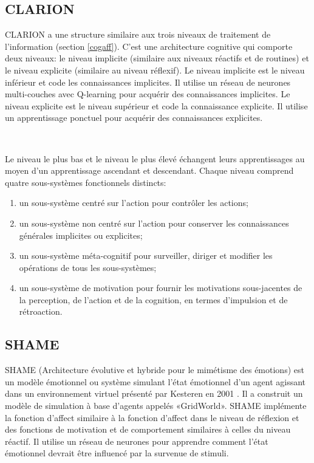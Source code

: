 \subsection{CLARION}

CLARION a une structure similaire aux trois niveaux de traitement de l’information (section \ref{cogaff}). C'est une architecture cognitive qui comporte deux niveaux: le niveau implicite (similaire aux niveaux réactifs et de routines) et le niveau explicite (similaire au niveau réflexif). Le niveau implicite est le niveau inférieur et code les connaissances implicites. Il utilise un réseau de neurones multi-couches avec Q-learning \parencite{watkins1992q} pour acquérir des connaissances implicites. Le niveau explicite est le niveau supérieur et code la connaissance explicite. Il utilise un apprentissage ponctuel pour acquérir des connaissances explicites.

~\par
Le niveau le plus bas et le niveau le plus élevé échangent leurs apprentissages au moyen d'un apprentissage ascendant et descendant. Chaque niveau comprend quatre sous-systèmes fonctionnels distincts:

\begin{enumerate}
\item un sous-système centré sur l'action pour contrôler les actions;
\item un sous-système non centré sur l'action pour conserver les connaissances générales implicites ou explicites;
\item un sous-système méta-cognitif pour surveiller, diriger et modifier les opérations de tous les sous-systèmes;
\item un sous-système de motivation pour fournir les motivations sous-jacentes de la perception, de l'action et de la cognition, en termes d'impulsion et de rétroaction.
\end{enumerate}

\subsection{SHAME}

SHAME (Architecture évolutive et hybride pour le mimétisme des émotions) est un modèle émotionnel ou système simulant l'état émotionnel d'un agent agissant dans un environnement virtuel présenté par Kesteren en 2001 \parencite{kesteren2001supervised}. Il a construit un modèle de simulation à base d'agents appelés «GridWorld». SHAME implémente la fonction d’affect similaire à la fonction d’affect dans le niveau de réflexion et des fonctions de motivation et de comportement similaires à celles du niveau réactif. Il utilise un réseau de neurones pour apprendre comment l'état émotionnel devrait être influencé par la survenue de stimuli.


